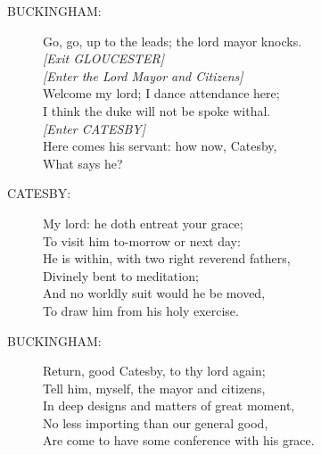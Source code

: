 \documentclass{article}
\begin{document}
\begin{description}
\item[BUCKINGHAM:] 
\hspace{1pt}Go, go, up to the leads; the lord mayor knocks.\\
{\it [Exit GLOUCESTER]}\\
{\it [Enter the Lord Mayor and Citizens]}\\
\hspace{1pt}Welcome my lord; I dance attendance here;\\
\hspace{1pt}I think the duke will not be spoke withal.\\
{\it [Enter CATESBY]}\\
\hspace{1pt}Here comes his servant: how now, Catesby,\\
\hspace{1pt}What says he?\\
\end{description}
\begin{description}
\item[CATESBY:] 
\hspace{1pt}My lord: he doth entreat your grace;\\
\hspace{1pt}To visit him to-morrow or next day:\\
\hspace{1pt}He is within, with two right reverend fathers,\\
\hspace{1pt}Divinely bent to meditation;\\
\hspace{1pt}And no worldly suit would he be moved,\\
\hspace{1pt}To draw him from his holy exercise.\\
\end{description}
\begin{description}
\item[BUCKINGHAM:] 
\hspace{1pt}Return, good Catesby, to thy lord again;\\
\hspace{1pt}Tell him, myself, the mayor and citizens,\\
\hspace{1pt}In deep designs and matters of great moment,\\
\hspace{1pt}No less importing than our general good,\\
\hspace{1pt}Are come to have some conference with his grace.\\
\end{description}
\end{document}
